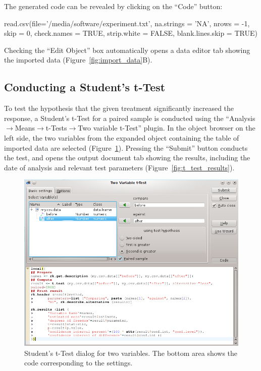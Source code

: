 The generated  code can be revealed by clicking on the ``Code'' button:

\begin{Code}
read.csv(file='/media/software/experiment.txt',
         na.strings = 'NA', nrows = -1, skip = 0,
         check.names = TRUE, strip.white = FALSE, blank.lines.skip = TRUE)
\end{Code}

Checking the ``Edit Object'' box automatically opens a data editor tab
showing the imported data (Figure~\ref{fig:import_data}B).

\subsection{Conducting a Student's t-Test}
\label{sec:conducting_ttest}
To test the hypothesis that the given treatment significantly increased the response, a Student's
t-Test for a paired sample is conducted using the
``Analysis$\rightarrow$Means$\rightarrow$t-Tests$\rightarrow$Two variable t-Test'' plugin.
In the object browser on the left side, the two variables from the expanded
 object containing the table of imported data 
are selected (Figure~\ref{fig:t_test_dialog}). 
Pressing the ``Submit'' button conducts the test, and opens the output document tab
showing the results, including the date of analysis and relevant test parameters (Figure~\ref{fig:t_test_results}).

\begin{figure}[b!]
 \centering
 \includegraphics[width=13.5cm]{./figures/t-test_dialog.png}
 \caption{Student's t-Test dialog for two variables. The bottom area shows the  code corresponding to the settings.}
 \label{fig:t_test_dialog}
\end{figure}

